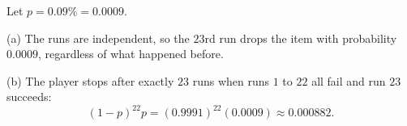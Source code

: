 Let $p=0.09\%=0.0009$.

(a) The runs are independent, so the $23$rd run drops the item with probability $\boxed{0.0009}$, regardless of what happened before.

(b) The player stops after exactly $23$ runs when runs $1$ to $22$ all fail and run $23$ succeeds:
\[(1-p)^{22}p=(0.9991)^{22}(0.0009)\approx\boxed{0.000882}.\]

